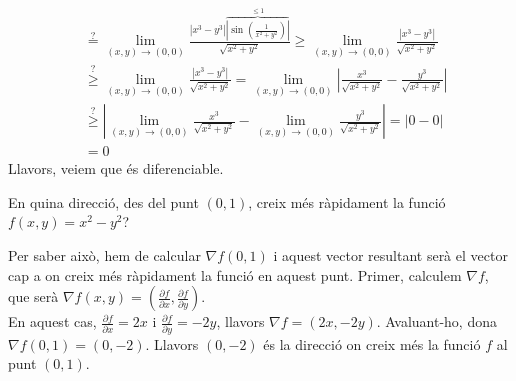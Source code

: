 \documentclass[a4paper, 12pt]{article}
\begin{document}
\begin{solucio}
\begin{displaymath}
\begin{split}
              &\stackrel{?}{=} \lim\limits_{\left(x,y\right) \to \left(0,0\right)} \frac{\left\lvert x^3-y^3\right\rvert \overbrace{\left\lvert \sin{\left(\frac{1}{x^2+y^2}\right)}\right\rvert}^{\leq 1}}{\sqrt{x^2+y^2}} \geq \lim\limits_{\left(x,y\right) \to \left(0,0\right)} \frac{\left\lvert x^3-y^3\right\rvert}{\sqrt{x^2+y^2}}\\
              &\stackrel{?}{\geq} \lim\limits_{\left(x,y\right) \to \left(0,0\right)} \frac{\left\lvert x^3-y^3\right\rvert}{\sqrt{x^2+y^2}}=\lim\limits_{\left(x,y\right) \to \left(0,0\right)} \left\lvert\frac{x^3}{\sqrt{x^2+y^2}}-\frac{y^3}{\sqrt{x^2+y^2}}\right\rvert\\
              &\stackrel{?}{\geq}\left\lvert\lim\limits_{\left(x,y\right) \to \left(0,0\right)}\frac{x^3}{\sqrt{x^2+y^2}}-\lim\limits_{\left(x,y\right) \to \left(0,0\right)}\frac{y^3}{\sqrt{x^2+y^2}}\right\rvert = \left\lvert 0 - 0\right\rvert\\
              & = 0
            \end{split}
        \end{displaymath}
        Llavors, veiem que és diferenciable.
    \end{solucio}

    \setcounter{numex}{22}
    \begin{exercici}
        En quina direcció, des del punt $\left(0,1\right)$, creix més ràpidament la funció $f(x,y) = x^2-y^2$?
    \end{exercici}
    \begin{solucio}
       Per saber això, hem de calcular $\nabla f(0,1)$ i aquest vector resultant serà el vector cap
       a on creix més ràpidament la funció en aquest punt. Primer, calculem $\nabla f$, que serà $\nabla f(x,y) = \left(\frac{\partial f}{\partial x}, \frac{\partial f}{\partial y}\right)$.\\
       En aquest cas, $\frac{\partial f}{\partial x} = 2x$ i $\frac{\partial f}{\partial y} = -2y$,
       llavors $\nabla f = \left(2x, -2y\right)$. Avaluant-ho, dona $\nabla f(0,1) = \left(0, -2\right)$.
       Llavors $\left(0, -2\right)$ és la direcció on creix més la funció $f$ al punt $\left(0, 1\right)$.
    \end{solucio}
\end{document}
